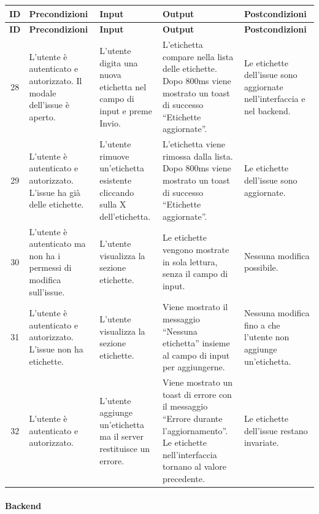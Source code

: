 {
\small
\begin{longtable}{|c|p{3.8cm}|p{3.8cm}|p{3.8cm}|p{3.8cm}|}
\hline
\textbf{ID} & \textbf{Precondizioni} & \textbf{Input} & \textbf{Output} & \textbf{Postcondizioni} \\
\hline
\endfirsthead
\hline
\textbf{ID} & \textbf{Precondizioni} & \textbf{Input} & \textbf{Output} & \textbf{Postcondizioni} \\
\hline
\endhead
28 &
L'utente \`e autenticato e autorizzato. Il modale dell'issue \`e aperto. &
L'utente digita una nuova etichetta nel campo di input e preme Invio. &
L'etichetta compare nella lista delle etichette. Dopo 800ms viene mostrato un toast di successo ``Etichette aggiornate''. &
Le etichette dell'issue sono aggiornate nell'interfaccia e nel backend. \\
\hline
29 &
L'utente \`e autenticato e autorizzato. L'issue ha gi\`a delle etichette. &
L'utente rimuove un'etichetta esistente cliccando sulla X dell'etichetta. &
L'etichetta viene rimossa dalla lista. Dopo 800ms viene mostrato un toast di successo ``Etichette aggiornate''. &
Le etichette dell'issue sono aggiornate. \\
\hline
30 &
L'utente \`e autenticato ma non ha i permessi di modifica sull'issue. &
L'utente visualizza la sezione etichette. &
Le etichette vengono mostrate in sola lettura, senza il campo di input. &
Nessuna modifica possibile. \\
\hline
31 &
L'utente \`e autenticato e autorizzato. L'issue non ha etichette. &
L'utente visualizza la sezione etichette. &
Viene mostrato il messaggio ``Nessuna etichetta'' insieme al campo di input per aggiungerne. &
Nessuna modifica fino a che l'utente non aggiunge un'etichetta. \\
\hline
32 &
L'utente \`e autenticato e autorizzato. &
L'utente aggiunge un'etichetta ma il server restituisce un errore. &
Viene mostrato un toast di errore con il messaggio ``Errore durante l'aggiornamento''. Le etichette nell'interfaccia tornano al valore precedente. &
Le etichette dell'issue restano invariate. \\
\hline
\end{longtable}
}

\paragraph{Backend}

